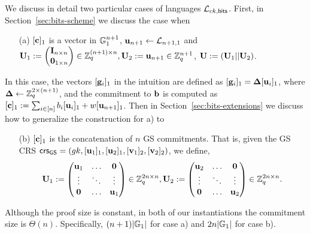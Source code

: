 We discuss in detail two particular cases of languages $\mathcal{\mathcal{L}}_{ck,\mathsf{bits}}$. First, in Section~\ref{sec:bits-scheme} we discuss the case when 
\begin{itemize}
\item[(a)] $[\mathbf{c}]_1$ is a vector in $\mathbb{G}_1^{n+1}$,  $\mathbf{u}_{n+1} \leftarrow \mathcal{L}_{n+1,1}$ and
 $\mathbf{{U}}_1:=\begin{pmatrix}{\mathbf{{I}}_{n\times n}}\\{\mathbf{{0}}_{1\times n}}\end{pmatrix} \in \mathbb{Z}_q^{(n+1) \times n}, \mathbf{{U}}_2:=\mathbf{u}_{n+1} \in \mathbb{Z}_q^{n+1}$, $\mathbf{{U}}:=(\mathbf{{U}}_1|| \mathbf{{U}}_2)$.    
\end{itemize}
In this case, the vectors $[\mathbf{g}_i]_1$ in the intuition are defined as $[\mathbf{g}_i]_1=\mathbf{{\Delta}} [\mathbf{u}_i]_1$, where $\mathbf{{\Delta}}\gets\mathbb{Z}_q^{2\times(n+1)}$, and the commitment 
to $\mathbf{b}$ is computed as $[\mathbf{c}]_1:=\sum_{i\in[n]}b_i[\mathbf{u}_i]_1+w[\mathbf{u}_{n+1}]_1$.
Then in Section~\ref{sec:bits-extensions} we discuss how to generalize the construction for a) to 
\begin{itemize}
 \item[(b)] $[\mathbf{c}]_1$ is the concatenation of $n$ GS commitments. That is, given the  GS CRS   $\mathsf{crs}_{\mathsf{GS}}=(gk,[\mathbf{u}_1]_1,[\mathbf{u}_2]_1,[\mathbf{v}_1]_2,[\mathbf{v}_2]_2)$, we define,
$$\mathbf{{U}}_1:=  \begin{pmatrix} \mathbf{u}_1 & \ldots & \mathbf{0}\\ \vdots & \ddots & \vdots \\   \mathbf{0} & \ldots & \mathbf{u}_1  \end{pmatrix} \in \mathbb{Z}_q^{2n \times n},  \mathbf{{U}}_2:= \begin{pmatrix} \mathbf{u}_2 & \ldots & \mathbf{0}\\ \vdots & \ddots & \vdots \\  \mathbf{0} & \ldots & \mathbf{u}_2  \end{pmatrix} \in \mathbb{Z}_q^{2n \times n}.$$ 
\end{itemize}

Although the proof size is constant, in both of our instantiations the commitment size is $\Theta(n)$. Specifically, $(n+1)|\mathbb{G}_1|$ for case a) and $2n|\mathbb{G}_1|$ for case b).


